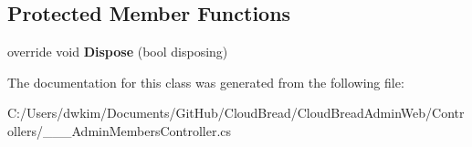 \subsection*{Protected Member Functions}
\begin{DoxyCompactItemize}
\item 
override void {\bfseries Dispose} (bool disposing)\hypertarget{a00005_abd23cd2bacf8036ba8ab0f5b495a2141}{}\label{a00005_abd23cd2bacf8036ba8ab0f5b495a2141}

\end{DoxyCompactItemize}


The documentation for this class was generated from the following file\+:\begin{DoxyCompactItemize}
\item 
C\+:/\+Users/dwkim/\+Documents/\+Git\+Hub/\+Cloud\+Bread/\+Cloud\+Bread\+Admin\+Web/\+Controllers/\+\_\+\+\_\+\+\_\+\+Admin\+Members\+Controller.\+cs\end{DoxyCompactItemize}
